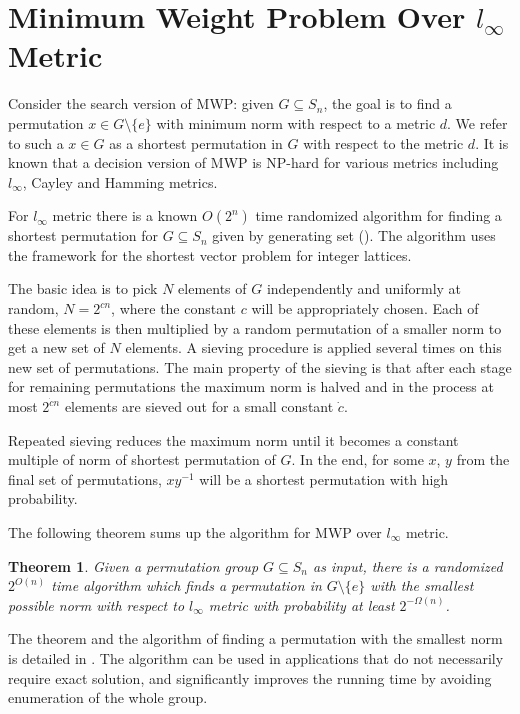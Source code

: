 \documentclass[12pt]{report}
\newtheorem{theorem}{Theorem}[section]
\begin{document}
\section{Minimum Weight Problem Over $l_{\infty}$ Metric}

\indent \par Consider the search version of MWP: given $G \subseteq S_n$, the goal is to find a permutation $x \in G \setminus \{e\}$ with minimum norm with respect to a metric $d$. We refer to such a $x \in G$ as a shortest permutation in $G$ with respect to the metric $d$. It is known that a decision version of MWP is NP-hard for various metrics including $l_\infty$, Cayley and Hamming metrics.

For $l_\infty$ metric there is a known $O(2^n)$ time randomized algorithm for finding a shortest permutation for $G \subseteq S_n$ given by generating set (\cite{Arvind}). The algorithm uses the framework for the shortest vector problem for integer lattices.

The basic idea is to pick $N$ elements of $G$ independently and uniformly at random, $N = 2^{cn}$, where the constant $c$ will be appropriately chosen. Each of these
elements is then multiplied by a random permutation of a smaller norm to get a
new set of $N$ elements. A sieving procedure is applied several times on this new set of permutations. The main property of the sieving is that after each stage for remaining permutations the maximum norm is halved and in the process at most $2^{\dot c n}$ elements are sieved out for a small constant $\dot c$.

Repeated sieving reduces the maximum norm until it becomes a constant multiple of norm of shortest permutation of $G$. In the end, for some $x$, $y$ from the
final set of permutations, $xy^{-1}$ will be a shortest permutation with high probability.

The following theorem sums up the algorithm for MWP over $l_\infty$ metric.

\begin{theorem}
	 Given a permutation group $G \subseteq S_n$ as input, there is a randomized $2^{O(n)}$ time algorithm which finds a permutation in $G \setminus \{e\}$ with the smallest possible norm with respect to $l_\infty$ metric with probability at least $2^{-\Omega (n)}$.
\end{theorem}

The theorem and the algorithm of finding a permutation with the smallest norm is detailed in \cite{Arvind}. The algorithm can be used in applications that do not necessarily require exact solution, and significantly improves the running time by avoiding enumeration of the whole group.
\end{document}
